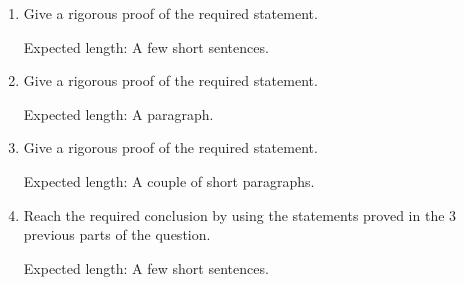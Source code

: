 \documentclass[12pt]{article}
\begin{document}
\begin{rubric}
\begin{enumerate}
    \item Give a rigorous proof of the required statement.
    
    Expected length: A few short sentences.
    \item Give a rigorous proof of the required statement.
    
    Expected length: A paragraph.
    \item Give a rigorous proof of the required statement.
    
    Expected length: A couple of short paragraphs.
    \item Reach the required conclusion by using the statements proved in the 3 previous parts of the question.
    
    Expected length: A few short sentences.
\end{enumerate}
\end{rubric}

\begin{solution}
\end{solution}

\begin{attribution}
\end{attribution}
\end{document}
